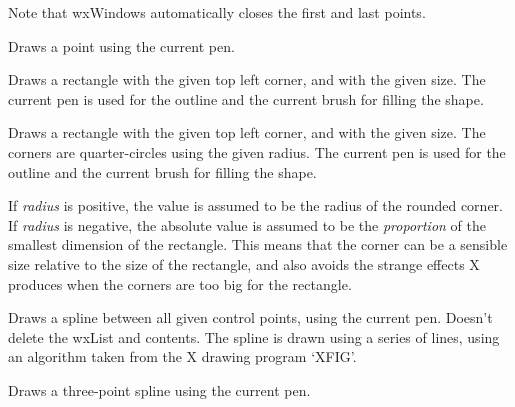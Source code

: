 Note that wxWindows automatically closes the first and last points.


\label{wxdcdrawpoint}


Draws a point using the current pen.

\label{wxdcdrawrectangle}


Draws a rectangle with the given top left corner, and with the given
size.  The current pen is used for the outline and the current brush
for filling the shape.

\label{wxdcdrawroundedrectangle}


Draws a rectangle with the given top left corner, and with the given
size.  The corners are quarter-circles using the given radius. The
current pen is used for the outline and the current brush for filling
the shape.

If {\it radius} is positive, the value is assumed to be the
radius of the rounded corner. If {\it radius} is negative,
the absolute value is assumed to be the {\it proportion} of the smallest
dimension of the rectangle. This means that the corner can be
a sensible size relative to the size of the rectangle, and also avoids
the strange effects X produces when the corners are too big for
the rectangle.

\label{wxdcdrawspline}


Draws a spline between all given control points, using the current
pen.  Doesn't delete the wxList and contents. The spline is drawn
using a series of lines, using an algorithm taken from the X drawing
program `XFIG'.


Draws a three-point spline using the current pen.

